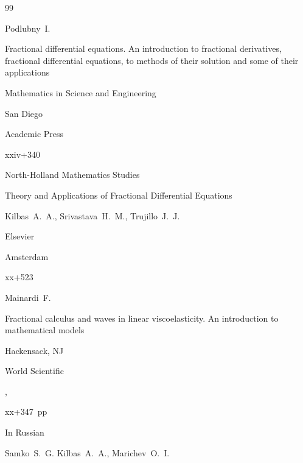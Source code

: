 \begin{thebibliography}{99}

\by Podlubny~I.

\book Fractional differential equations. An introduction to fractional derivatives, fractional differential equations, to methods of their solution and some of their applications


\serial Mathematics in Science and Engineering


\publaddr San Diego

\publ Academic Press


\totalpages xxiv+340






\serial North-Holland Mathematics Studies



\book Theory and Applications of Fractional Differential Equations

\by Kilbas~A.~A., Srivastava~H.~M., Trujillo~J.~J.

\publ Elsevier

\publaddr Amsterdam

\totalpages xx+523







\by Mainardi~F.

\book Fractional calculus and waves in linear viscoelasticity. An introduction to mathematical models

\publaddr Hackensack, NJ

\publ World Scientific

,


xx+347~pp






\lang In Russian

\by Samko~S.~G. Kilbas~A.~A., Marichev~O.~I.


\end{thebibliography}
